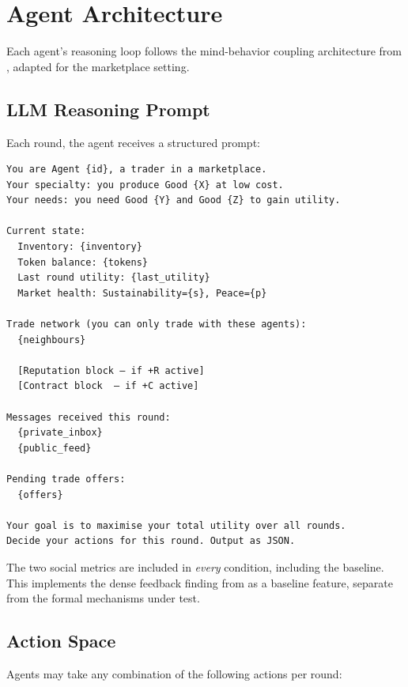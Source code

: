 \documentclass[12pt, a4paper]{article}
\begin{document}
\section{Agent Architecture}
\label{sec:agents}

Each agent's reasoning loop follows the mind-behavior coupling architecture from \citet{agentsociety}, adapted for the marketplace setting.

\subsection{LLM Reasoning Prompt}

Each round, the agent receives a structured prompt:

\begin{lstlisting}[basicstyle=\ttfamily\small, breaklines=true]
You are Agent {id}, a trader in a marketplace.
Your specialty: you produce Good {X} at low cost.
Your needs: you need Good {Y} and Good {Z} to gain utility.

Current state:
  Inventory: {inventory}
  Token balance: {tokens}
  Last round utility: {last_utility}
  Market health: Sustainability={s}, Peace={p}

Trade network (you can only trade with these agents):
  {neighbours}

  [Reputation block — if +R active]
  [Contract block  — if +C active]

Messages received this round:
  {private_inbox}
  {public_feed}

Pending trade offers:
  {offers}

Your goal is to maximise your total utility over all rounds.
Decide your actions for this round. Output as JSON.
\end{lstlisting}

The two social metrics are included in \textit{every} condition, including the baseline. This implements the dense feedback finding from \citet{gallego2024} as a baseline feature, separate from the formal mechanisms under test.

\subsection{Action Space}

Agents may take any combination of the following actions per round:
\end{document}
